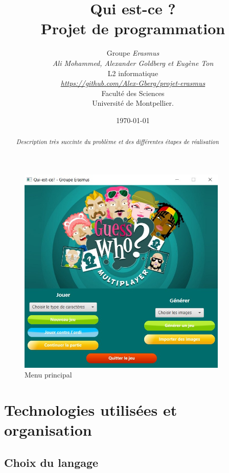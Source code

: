 \documentclass[a4paper]{article}
\title{  Qui est-ce ?\\         %
  Projet de programmation}
\author{Groupe \emph{Erasmus}\\
  \emph{Ali Mohammed, Alexander Goldberg et Eugène Ton}\\
  L2 informatique\\
  \emph{\url{https://github.com/Alex-Gberg/projet-erasmus}}\\
  Faculté des Sciences\\
Université de Montpellier.}
\date{\today}
\begin{document}
\maketitle                    %

\begin{figure}[ht]
    \centering
    \includegraphics[width = 10cm, height=10cm]{qui est ce main menu.jpg}
    \caption{Menu principal}
\end{figure}
\newpage

\begin{abstract}     %

  \emph{Description très succinte du problème et des différentes étapes de réalisation}

\end{abstract}


\section{ Technologies utilisées  et organisation} %


\subsection{Choix du langage}         %
\end{document}
